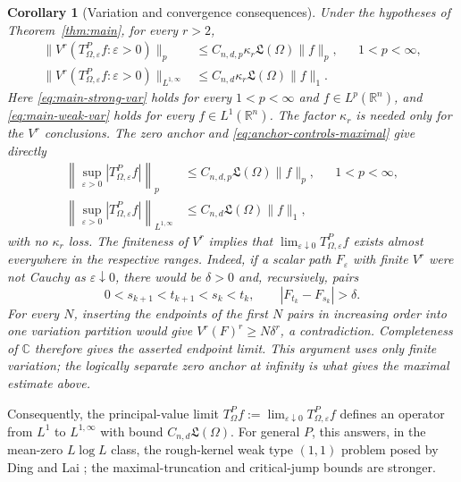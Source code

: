 \documentclass[11pt]{article}
\numberwithin{equation}{section}
\newtheorem{corollary}[theorem]{Corollary}
\theoremstyle{remark}
\theoremstyle{definition}
\newcommand{\R}{\mathbb R}
\newcommand{\norm}[1]{\lVert #1\rVert}
\begin{document}
\begin{corollary}[Variation and convergence consequences]
\label{cor:unweighted-consequences}
Under the hypotheses of Theorem~\ref{thm:main}, for every $r>2$,
\begin{align}
 \norm{V^r(T^P_{\Omega,\varepsilon}f:\varepsilon>0)}_p
 &\le C_{n,d,p}\kappa_r\mathfrak L(\Omega)\norm f_p,
 &&1<p<\infty,\label{eq:main-strong-var}\\
 \norm{V^r(T^P_{\Omega,\varepsilon}f:\varepsilon>0)}_{L^{1,\infty}}
 &\le C_{n,d}\kappa_r\mathfrak L(\Omega)\norm f_1.
 \label{eq:main-weak-var}
\end{align}
Here \eqref{eq:main-strong-var} holds for every $1<p<\infty$ and
$f\in L^p(\R^n)$, and \eqref{eq:main-weak-var} holds for every
$f\in L^1(\R^n)$.  The factor $\kappa_r$ is needed only for the
$V^r$ conclusions.  The zero anchor and
\eqref{eq:anchor-controls-maximal} give directly
\begin{align*}
 \left\|\sup_{\varepsilon>0}|T^P_{\Omega,\varepsilon}f|\right\|_p
 &\le C_{n,d,p}\mathfrak L(\Omega)\norm f_p,
 &&1<p<\infty,\\
 \left\|\sup_{\varepsilon>0}|T^P_{\Omega,\varepsilon}f|\right\|_{L^{1,\infty}}
 &\le C_{n,d}\mathfrak L(\Omega)\norm f_1,
\end{align*}
with no $\kappa_r$ loss.  The finiteness of $V^r$ implies that
$\lim_{\varepsilon\downarrow0}T^P_{\Omega,\varepsilon}f$ exists almost
everywhere in the respective ranges.  Indeed, if a scalar path $F_\varepsilon$
with finite $V^r$ were not Cauchy as $\varepsilon\downarrow0$, there would be
$\delta>0$ and, recursively, pairs
\[
 0<s_{k+1}<t_{k+1}<s_k<t_k,
 \qquad |F_{t_k}-F_{s_k}|>\delta .
\]
For every $N$, inserting the endpoints of the first $N$ pairs in increasing
order into one variation partition would give
$V^r(F)^r\ge N\delta^r$, a contradiction.  Completeness of $\mathbb C$
therefore gives the asserted endpoint limit.  This argument uses only finite
variation; the logically separate zero anchor at infinity is what gives the
maximal estimate above.
\end{corollary}

Consequently, the principal-value limit
$T^P_\Omega f:=\lim_{\varepsilon\downarrow0}T^P_{\Omega,\varepsilon}f$
defines an operator from $L^1$ to $L^{1,\infty}$ with bound
$C_{n,d}\mathfrak L(\Omega)$.  For general $P$, this answers, in the
mean-zero $L\log L$ class, the rough-kernel weak type $(1,1)$ problem posed
by Ding and Lai \cite[\S6.1]{DingLai}; the maximal-truncation and
critical-jump bounds are stronger.
\end{document}
